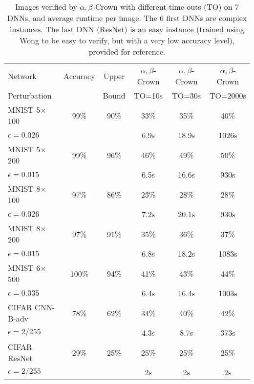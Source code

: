\begin{table}[t!]
	\centering
	\begin{tabular}{||l|c|c||c|c|c||}
		\hline
		Network & Accuracy & Upper  & $\alpha,\beta$-Crown& $\alpha,\beta$-Crown & $\alpha,\beta$-Crown \\ 
		Perturbation &   & Bound & TO=10s & TO=30s & TO=2000s\\ \hline
		MNIST 5$\times$100 & 99\% & 90\% & 33\% & 35\% & 40\%   \\
		$\epsilon = 0.026$ &  &  & 6.9s &  18.9s &  1026s  \\  \hline
		MNIST 5$\times$200 & 99\%  & 96\%  & 46\%  & 49\%  & 50\%   \\ 
		$\epsilon = 0.015$ & &  & 6.5s &  16.6s &  930s  \\  \hline
		MNIST 8$\times$100 & 97\%  & 86\%  & 23\%  & 28\%  & 28\%   \\
		$\epsilon = 0.026$ &  &  & 7.2s &  20.1s &  930s  \\  \hline
		MNIST 8$\times$200 & 97\%  & 91\%  & 35\%  & 36\%  & 37\%   \\ 
		$\epsilon = 0.015$ & &  & 6.8s &  18.2s &  1083s  \\  \hline
		MNIST 6$\times$500 & 100\%  & 94\%  & 41\%  & 43\%  & 44\%   \\ 
		$\epsilon = 0.035$ & &  & 6.4s &  16.4s &  1003s  \\  \hline
		CIFAR CNN-B-adv & 78\%  & 62\%  &  34\% & 40\%  & 42\%   \\
		$\epsilon = 2/255$&  &  & 4.3s & 8.7s & 373s  \\ \hline \hline
		CIFAR ResNet & 29\%  & 25\%  & 25\%  & 25\%  & 25\%   \\
		$\epsilon = 2/255$ &  &  & 2s & 2s & 2s  \\ \hline
	\end{tabular}
	\caption{Images verified by $\alpha,\beta$-Crown with different time-outs (TO) on 7 DNNs, and average runtime per image. The 6 first DNNs are complex instances. The last DNN (ResNet) is an easy instance (trained using Wong to be easy to verify, but with a very low accuracy level), provided for reference.}
	\label{table_beta}
	\vspace{-0.3cm}
\end{table}

